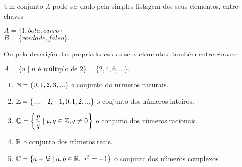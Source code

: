 \documentclass{beamer}
\begin{document}
    \begin{frame}
        \vspace{.4cm}
        Um conjunto $A$ pode ser dado pela simples listagem dos seus elementos, entre chaves:\pause
            \begin{center}
                $A = \{1, bola, carro\}$\pause\\
                $B = \{verdade, falso\}.$\pause
            \end{center}


        Ou pela descri{\c c}{\~a}o das propriedades dos seus elementos, tamb\'em  entre chaves:\pause
        \begin{center}
            $A = \{n \mid n \mbox{ \'e m{\'u}ltiplo de } 2\} = \{2,4,6,...\}.$\pause
        \end{center}

        \begin{enumerate}[label={\arabic*})]
            \item $\mathbb{N} = \{0,1,2,3,...\}$ o conjunto do n{\'u}meros naturais.\pause
            \item $\mathbb{Z} = \{...,-2,-1,0,1,2,...\}$ o conjunto dos n{\'u}meros inteiros.\pause
            \item $\mathbb{Q} = \left\{\dfrac{p}{q} \mid p,q \in \mathbb{Z}, q \neq 0 \right\}$ o conjunto dos n{\'u}meros racionais.\pause
            \item $\mathbb{R} $ o conjunto dos n{\'u}meros reais.\pause
            \item $\mathbb{C} = \{a + bi \mid a,b \in \mathbb{R},\ i^2 = -1\}$ o conjunto dos n\'umeros complexos.
        \end{enumerate}
    \end{frame}
\end{document}
